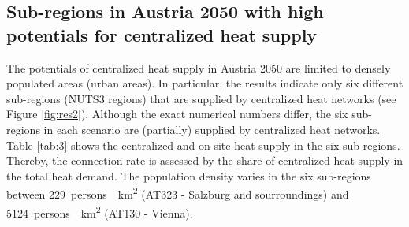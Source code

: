 \subsection{Sub-regions in Austria 2050 with high potentials for centralized heat supply}\label{res:3}
The potentials of centralized heat supply in Austria 2050 are limited to densely populated areas (urban areas). In particular, the results indicate only six different sub-regions (NUTS3 regions) that are supplied by centralized heat networks (see Figure \ref{fig:res2}). Although the exact numerical numbers differ, the six sub-regions in each scenario are (partially) supplied by centralized heat networks. Table \ref{tab:3} shows the centralized and on-site heat supply in the six sub-regions. Thereby, the connection rate is assessed by the share of centralized heat supply in the total heat demand. The population density varies in the six sub-regions between \SI{229}{persons \per \kilo\metre^2} (AT323 - Salzburg and sourroundings) and \SI{5124}{persons \per \kilo\metre^2} (AT130 - Vienna).

